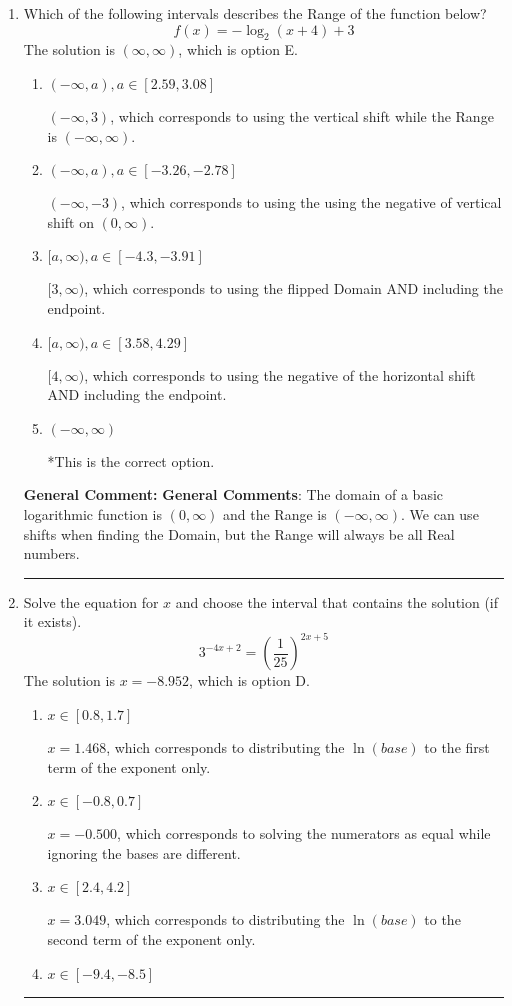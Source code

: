 \documentclass{extbook}[14pt]
\newcommand{\litem}[1]{\item #1

\rule{\textwidth}{0.4pt}}
\begin{document}
\begin{enumerate}\litem{
Which of the following intervals describes the Range of the function below?
\[ f(x) = -\log_2{(x+4)}+3 \]The solution is \( (\infty, \infty) \), which is option E.\begin{enumerate}[label=\Alph*.]
\item \( (-\infty, a), a \in [2.59, 3.08] \)

$(-\infty, 3)$, which corresponds to using the vertical shift while the Range is $(-\infty, \infty)$.
\item \( (-\infty, a), a \in [-3.26, -2.78] \)

$(-\infty, -3)$, which corresponds to using the using the negative of vertical shift on $(0, \infty)$.
\item \( [a, \infty), a \in [-4.3, -3.91] \)

$[3, \infty)$, which corresponds to using the flipped Domain AND including the endpoint.
\item \( [a, \infty), a \in [3.58, 4.29] \)

$[4, \infty)$, which corresponds to using the negative of the horizontal shift AND including the endpoint.
\item \( (-\infty, \infty) \)

*This is the correct option.
\end{enumerate}

\textbf{General Comment:} \textbf{General Comments}: The domain of a basic logarithmic function is $(0, \infty)$ and the Range is $(-\infty, \infty)$. We can use shifts when finding the Domain, but the Range will always be all Real numbers.
}
\litem{
Solve the equation for $x$ and choose the interval that contains the solution (if it exists).
\[ 3^{-4x+2} = \left(\frac{1}{25}\right)^{2x+5} \]The solution is \( x = -8.952 \), which is option D.\begin{enumerate}[label=\Alph*.]
\item \( x \in [0.8, 1.7] \)

$x = 1.468$, which corresponds to distributing the $\ln(base)$ to the first term of the exponent only.
\item \( x \in [-0.8, 0.7] \)

$x = -0.500$, which corresponds to solving the numerators as equal while ignoring the bases are different.
\item \( x \in [2.4, 4.2] \)

$x = 3.049$, which corresponds to distributing the $\ln(base)$ to the second term of the exponent only.
\item \( x \in [-9.4, -8.5] \)


\end{enumerate}}
\end{enumerate}
\end{document}
